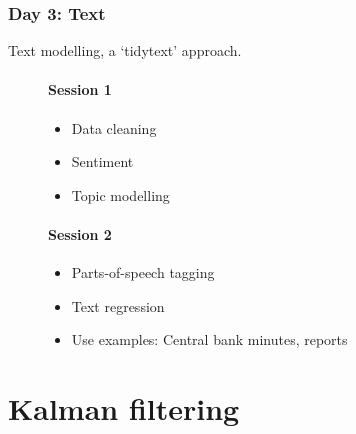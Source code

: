 \documentclass[
  letterpaper,
]{book}
\providecommand{\tightlist}{%
  \setlength{\itemsep}{0pt}\setlength{\parskip}{0pt}}\usepackage{longtable,booktabs,array}
\begin{document}
\hypertarget{day-3-text}{%
\subsection{Day 3: Text}\label{day-3-text}}

Text modelling, a `tidytext' approach.

\begin{figure}

\begin{minipage}[t]{0.50\linewidth}

{\centering 

\hypertarget{session-1}{%
\subsubsection{Session 1}\label{session-1}}

\begin{itemize}
\tightlist
\item
  Data cleaning
\item
  Sentiment
\item
  Topic modelling
\end{itemize}

}

\end{minipage}%
%
\begin{minipage}[t]{0.50\linewidth}

{\centering 

\hypertarget{session-2}{%
\subsubsection{Session 2}\label{session-2}}

\begin{itemize}
\tightlist
\item
  Parts-of-speech tagging
\item
  Text regression
\item
  Use examples: Central bank minutes, reports
\end{itemize}

}

\end{minipage}%

\end{figure}

\hypertarget{kalman-filtering}{%
\chapter{Kalman filtering}\label{kalman-filtering}}
\end{document}
